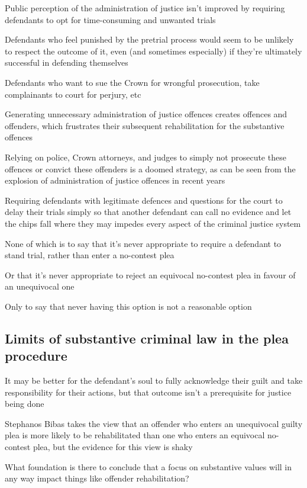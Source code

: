 Public perception of the administration of justice isn't improved by requiring defendants to opt for time-consuming and unwanted trials

Defendants who feel punished by the pretrial process would seem to be unlikely to respect the outcome of it, even (and sometimes especially) if they're ultimately successful in defending themselves

Defendants who want to sue the Crown for wrongful prosecution, take complainants to court for perjury, etc

Generating unnecessary administration of justice offences creates offences and offenders, which frustrates their subsequent rehabilitation for the substantive offences

Relying on police, Crown attorneys, and judges to simply not prosecute these offences or convict these offenders is a doomed strategy, as can be seen from the explosion of administration of justice offences in recent years

Requiring defendants with legitimate defences and questions for the court to delay their trials simply so that another defendant can call no evidence and let the chips fall where they may impedes every aspect of the criminal justice system

None of which is to say that it's never appropriate to require a defendant to stand trial, rather than enter a no-contest plea

Or that it's never appropriate to reject an equivocal no-contest plea in favour of an unequivocal one

Only to say that never having this option is not a reasonable option

\subsection{Limits of substantive criminal law in the plea procedure}

It may be better for the defendant's soul to fully acknowledge their guilt and take responsibility for their actions, but that outcome isn't a prerequisite for justice being done

Stephanos Bibas takes the view that an offender who enters an unequivocal guilty plea is more likely to be rehabilitated than one who enters an equivocal no-contest plea, but the evidence for this view is shaky

What foundation is there to conclude that a focus on substantive values will in any way impact things like offender rehabilitation?

